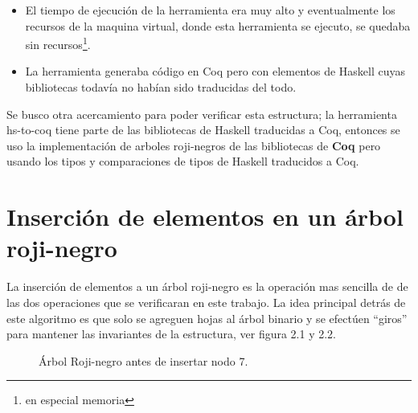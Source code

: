 \documentclass[8pt,leqno,pdflatex,spanish]{book}
\newcommand{\coq}{\textbf{Coq}}
\newcommand{\Arn}{Árbol Roji-negro}
\newcommand{\arn}{árbol roji-negro}
\newcommand{\arns}{arboles roji-negros}
\theoremstyle{plain}
\theoremstyle{definition}
\theoremstyle{remark}
\begin{document}
\begin{itemize}
    \item El tiempo de ejecuci\'on de la herramienta era muy alto y eventualmente los recursos de 
    la maquina virtual, donde esta herramienta se ejecuto, se quedaba sin recursos\footnote{en 
    especial memoria}.
    \item La herramienta generaba c\'odigo en Coq pero con elementos de Haskell cuyas bibliotecas 
    todavía no habían sido traducidas del todo.
\end{itemize}{}

Se busco otra acercamiento para poder verificar esta estructura; la herramienta hs-to-coq tiene 
parte de las bibliotecas de Haskell traducidas a Coq, entonces se uso la implementación de {\arns} 
de las bibliotecas de {\coq}\cite{MSetRBT} pero usando los tipos y comparaciones de tipos de 
Haskell traducidos a Coq.

\section{Inserción de elementos en un {\arn}}

La inserci\'on de elementos a un {\arn} es la operaci\'on mas sencilla de de las dos operaciones 
que se verificaran en este trabajo. La idea principal detrás de este algoritmo es que solo se 
agreguen hojas al \'arbol binario y se efectúen ``giros'' para mantener las invariantes de la 
estructura, ver figura 2.1 y 2.2.
\begin{figure}
\centering 
\captionsetup{justification=centering}
\label{arbolRB}
\caption{{\Arn} antes de insertar nodo 7.}
\end{figure}
\end{document}
